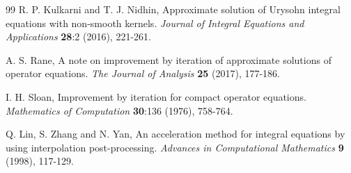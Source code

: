 \documentclass[sn-mathphys-num]{sn-jnl}%
\theoremstyle{thmstyleone}%
\theoremstyle{thmstyletwo}%
\theoremstyle{thmstylethree}%
\begin{document}
\begin{thebibliography}{99}
	 R. P. Kulkarni and T. J. Nidhin,  Approximate solution of Urysohn integral equations with non-smooth kernels. \textit{Journal of Integral Equations and Applications} \textbf{28}:2 (2016), 221-261. 
	
	A. S. Rane, A note on improvement by iteration of approximate solutions of operator equations. \textit{The Journal of Analysis} \textbf{25} (2017), 177-186.  
	
	 I. H. Sloan, Improvement by iteration for compact operator equations. \textit{Mathematics of Computation} \textbf{30}:136 (1976), 758-764. 
	
	
	 Q. Lin, S. Zhang and N. Yan, An acceleration method for integral equations by using interpolation post-processing. \textit{Advances in Computational Mathematics} \textbf{9} (1998), 117-129. 
	
\end{thebibliography}
\end{document}
